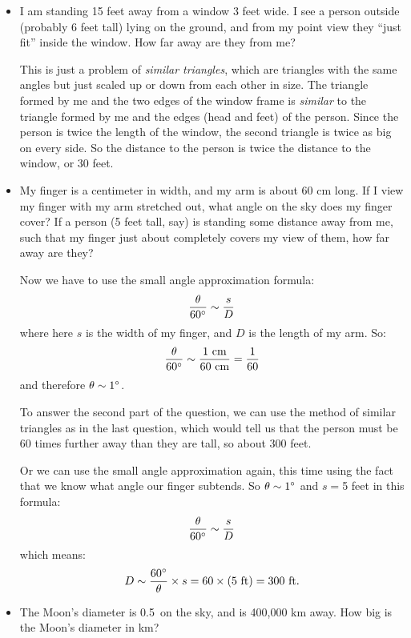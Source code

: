 \documentclass[12pt, preprint]{aastex}
\begin{document}
\begin{itemize}
  \item I am standing 15 feet away from a window 3 feet wide. I see a
    person outside (probably 6 feet tall) lying on the ground, and
    from my point view they ``just fit'' inside the window. How far
    away are they from me?

    \begin{answer}
      This is just a problem of {\it similar triangles}, which are
      triangles with the same angles but just scaled up or down from
      each other in size. The triangle formed by me and the two edges
      of the window frame is {\it similar} to the triangle formed by
      me and the edges (head and feet) of the person. Since the person
      is twice the length of the window, the second triangle is twice
      as big on every side. So the distance to the person is twice the
      distance to the window, or 30 feet.
    \end{answer}
  \item My finger is a centimeter in width, and my arm is about 60 cm
    long. If I view my finger with my arm stretched out, what angle on
    the sky does my finger cover? If a person (5 feet tall, say) is
    standing some distance away from me, such that my finger just
    about completely covers my view of them, how far away are they?

    \begin{answer}
      Now we have to use the small angle approximation formula:
      \begin{equation}
        \frac{\theta}{60{}^\circ} \sim \frac{s}{D}
      \end{equation}
      where here $s$ is the width of my finger, and $D$ is the length
      of my arm. So:
      \begin{equation}
        \frac{\theta}{60{}^\circ} \sim \frac{1 {\rm ~cm}}{60 {\rm ~cm}}
        = \frac{1}{60}
      \end{equation}
      and therefore $\theta\sim 1{}^\circ$.

      To answer the second part of the question, we can use the method
      of similar triangles as in the last question, which would tell
      us that the person must be 60 times further away than they are
      tall, so about 300 feet.

      Or we can use the small angle approximation again, this time
      using the fact that we know what angle our finger subtends. So
      $\theta \sim 1{}^\circ$ and $s=$5 feet in this formula:
      \begin{equation}
        \frac{\theta}{60{}^\circ} \sim \frac{s}{D}
      \end{equation}
      which means:
      \begin{equation}
        D \sim \frac{60{}^\circ}{\theta} \times s = 60\times (5{\rm
          ~ft}) = 300 {\rm ~ft}.
      \end{equation}
    \end{answer}
  \item The Moon's diameter is 0.5\degree\ on the sky, and is 400,000 km
    away. How big is the Moon's diameter in km?


\end{itemize}
\end{document}
